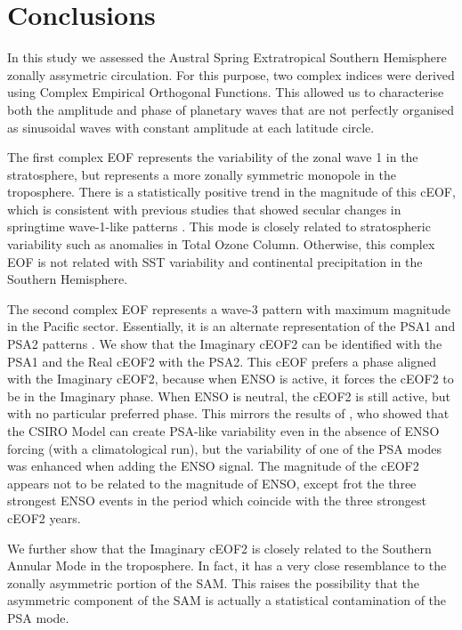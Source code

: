 \documentclass[smallextended]{svjour3}       %
\begin{document}
\hypertarget{conclusions}{%
\section{Conclusions}\label{conclusions}}

In this study we assessed the Austral Spring Extratropical Southern Hemisphere zonally assymetric circulation.
For this purpose, two complex indices were derived using Complex Empirical Orthogonal Functions.
This allowed us to characterise both the amplitude and phase of planetary waves that are not perfectly organised as sinusoidal waves with constant amplitude at each latitude circle.

The first complex EOF represents the variability of the zonal wave 1 in the stratosphere, but represents a more zonally symmetric monopole in the troposphere.
There is a statistically positive trend in the magnitude of this cEOF, which is consistent with previous studies that showed secular changes in springtime wave-1-like patterns \citep[e.g.][]{raphael2003}.
This mode is closely related to stratospheric variability such as anomalies in Total Ozone Column.
Otherwise, this complex EOF is not related with SST variability and continental precipitation in the Southern Hemisphere.

The second complex EOF represents a wave-3 pattern with maximum magnitude in the Pacific sector.
Essentially, it is an alternate representation of the PSA1 and PSA2 patterns \citep{mo2001}.
We show that the Imaginary cEOF2 can be identified with the PSA1 and the Real cEOF2 with the PSA2.
This cEOF prefers a phase aligned with the Imaginary cEOF2, because when ENSO is active, it forces the cEOF2 to be in the Imaginary phase.
When ENSO is neutral, the cEOF2 is still active, but with no particular preferred phase.
This mirrors the results of \citet{cai2002}, who showed that the CSIRO Model can create PSA-like variability even in the absence of ENSO forcing (with a climatological run), but the variability of one of the PSA modes was enhanced when adding the ENSO signal.
The magnitude of the cEOF2 appears not to be related to the magnitude of ENSO, except frot the three strongest ENSO events in the period which coincide with the three strongest cEOF2 years.

We further show that the Imaginary cEOF2 is closely related to the Southern Annular Mode in the troposphere.
In fact, it has a very close resemblance to the zonally asymmetric portion of the SAM.
This raises the possibility that the asymmetric component of the SAM is actually a statistical contamination of the PSA mode.
\end{document}
